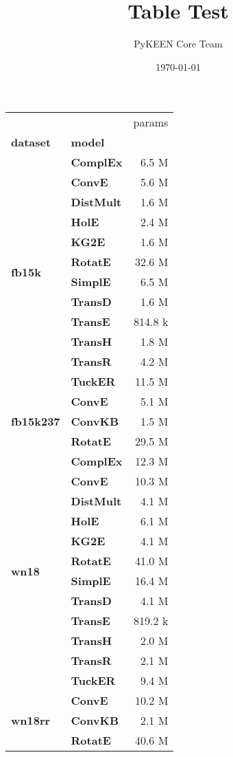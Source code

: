 \documentclass[journal]{IEEEtran}
\title{Table Test}
\author{PyKEEN Core Team}
\date{\today}
\begin{document}
\begin{tabular}{llr}
\toprule
       &        &   params \\
\textbf{dataset} & \textbf{model} &          \\
\midrule
\multirow{12}{*}{\textbf{fb15k}} & \textbf{ComplEx} &    6.5 M \\
       & \textbf{ConvE} &    5.6 M \\
       & \textbf{DistMult} &    1.6 M \\
       & \textbf{HolE} &    2.4 M \\
       & \textbf{KG2E} &    1.6 M \\
       & \textbf{RotatE} &   32.6 M \\
       & \textbf{SimplE} &    6.5 M \\
       & \textbf{TransD} &    1.6 M \\
       & \textbf{TransE} &  814.8 k \\
       & \textbf{TransH} &    1.8 M \\
       & \textbf{TransR} &    4.2 M \\
       & \textbf{TuckER} &   11.5 M \\
\cline{1-3}
\multirow{3}{*}{\textbf{fb15k237}} & \textbf{ConvE} &    5.1 M \\
       & \textbf{ConvKB} &    1.5 M \\
       & \textbf{RotatE} &   29.5 M \\
\cline{1-3}
\multirow{12}{*}{\textbf{wn18}} & \textbf{ComplEx} &   12.3 M \\
       & \textbf{ConvE} &   10.3 M \\
       & \textbf{DistMult} &    4.1 M \\
       & \textbf{HolE} &    6.1 M \\
       & \textbf{KG2E} &    4.1 M \\
       & \textbf{RotatE} &   41.0 M \\
       & \textbf{SimplE} &   16.4 M \\
       & \textbf{TransD} &    4.1 M \\
       & \textbf{TransE} &  819.2 k \\
       & \textbf{TransH} &    2.0 M \\
       & \textbf{TransR} &    2.1 M \\
       & \textbf{TuckER} &    9.4 M \\
\cline{1-3}
\multirow{3}{*}{\textbf{wn18rr}} & \textbf{ConvE} &   10.2 M \\
       & \textbf{ConvKB} &    2.1 M \\
       & \textbf{RotatE} &   40.6 M \\
\bottomrule
\end{tabular}
\end{document}
